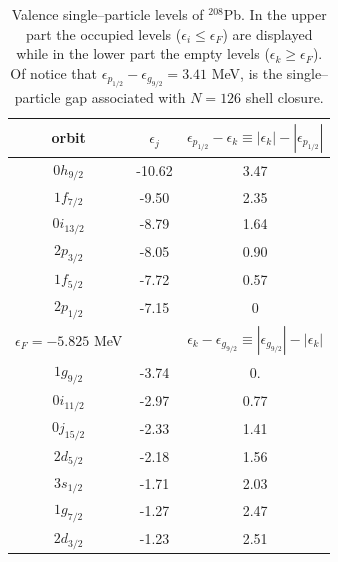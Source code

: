 \begin{table}
	\begin{center}
\begin{tabular}{|c|c|c|}
\hline \rule[-2ex]{0pt}{5.5ex}   orbit& $\epsilon_j$  & $\epsilon_{p_{1/2}}-\epsilon_k\equiv|\epsilon_k|-|\epsilon_{p_{1/2}}|$  \\ 
\hline
$0h_{9/2}$&-10.62 &3.47\\
$1f_{7/2}$& -9.50&2.35\\
$0i_{13/2}$& -8.79&1.64\\
$2p_{3/2}$& -8.05&0.90\\
$1f_{5/2}$& -7.72&0.57\\
$2p_{1/2}$& -7.15&0\\
\hline \rule[-2ex]{0pt}{5.5ex}   $\epsilon_F=-5.825$ MeV&   & $\epsilon_k-\epsilon_{g_{9/2}}\equiv|\epsilon_{g_{9/2}}|-|\epsilon_k|$  \\ 
\hline
$1g_{9/2}$&-3.74 &0.\\
$0i_{11/2}$& -2.97&0.77\\
$0j_{15/2}$& -2.33&1.41\\
$2d_{5/2}$& -2.18&1.56\\
$3s_{1/2}$& -1.71&2.03\\
$1g_{7/2}$& -1.27&2.47\\
$2d_{3/2}$& -1.23&2.51\\
\hline
\end{tabular}
\end{center}
\caption{Valence single--particle levels of $^{208}$Pb. In the upper part the occupied levels ($\epsilon_i\leq\epsilon_F$) are displayed while in the lower part the empty levels ($\epsilon_k\geq\epsilon_F$). Of notice that $\epsilon_{p_{1/2}}-\epsilon_{g_{9/2}}=3.41$ MeV, is the single--particle gap associated with $N=126$ shell closure.}\label{tab1E1}
 \end{table}
 
